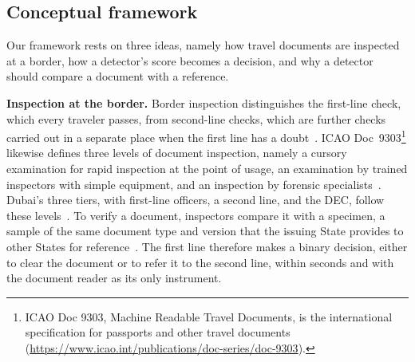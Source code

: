 \documentclass[12pt,a4paper]{article}
\begin{document}
\subsection{Conceptual framework}
Our framework rests on three ideas, namely how travel documents are inspected at a border, how a detector's score becomes a decision, and why a detector should compare a document with a reference.

\textbf{Inspection at the border.} Border inspection distinguishes the first-line check, which every traveler passes, from second-line checks, which are further checks carried out in a separate place when the first line has a doubt~\cite{eu2022handbook}. ICAO Doc~9303\footnote{ICAO Doc 9303, Machine Readable Travel Documents, is the international specification for passports and other travel documents (\url{https://www.icao.int/publications/doc-series/doc-9303}).} likewise defines three levels of document inspection, namely a cursory examination for rapid inspection at the point of usage, an examination by trained inspectors with simple equipment, and an inspection by forensic specialists~\cite{icao9303p2}. Dubai's three tiers, with first-line officers, a second line, and the DEC, follow these levels~\cite{thenational2024fake}. To verify a document, inspectors compare it with a specimen, a sample of the same document type and version that the issuing State provides to other States for reference~\cite{icao9303p2}. The first line therefore makes a binary decision, either to clear the document or to refer it to the second line, within seconds and with the document reader as its only instrument.
\end{document}
